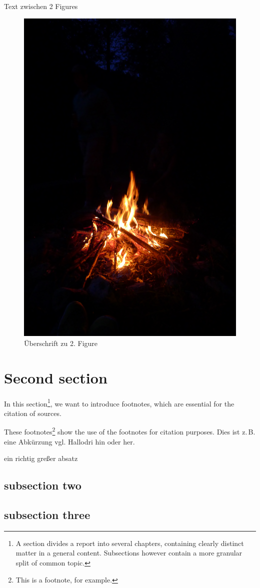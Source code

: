 \documentclass[fontsize=12pt,parskip=false,numbers=enddot]{scrartcl} %
\newcommand{\zb}{z.\,B.\xspace}
\newcommand{\vgl}{vgl.\xspace}
\begin{document}
Text zwischen 2 Figures

\begin{figure}[!h]
\centering
\caption{Überschrift zu 2. Figure}
\includegraphics[height=\textwidth,angle=270]{p1}
\end{figure}

\clearpage
\section{Second section}
In this section\footnote{A section divides a report into several chapters, containing clearly distinct matter in a general content. Subsections however contain a more granular split of  common topic.}, we want to introduce footnotes, which are essential for the citation of sources. 

These footnotes\footnote{This is a footnote, for example.} show the use of the footnotes for \glqq citation\grqq{} purposes.
Dies ist \zb eine Abkürzung \vgl Hallodri hin oder her.



\noindent ein richtig greßer absatz
\subsection{subsection two}
\lipsum[2-2]
\subsection{subsection three}
\lipsum[3-3]
\end{document}
